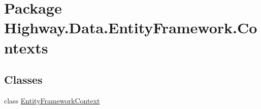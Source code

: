 \hypertarget{namespace_highway_1_1_data_1_1_entity_framework_1_1_contexts}{\section{Package Highway.\-Data.\-Entity\-Framework.\-Contexts}
\label{namespace_highway_1_1_data_1_1_entity_framework_1_1_contexts}
}
\subsection*{Classes}
\begin{DoxyCompactItemize}
\item 
class \hyperlink{class_highway_1_1_data_1_1_entity_framework_1_1_contexts_1_1_entity_framework_context}{Entity\-Framework\-Context}
\end{DoxyCompactItemize}
